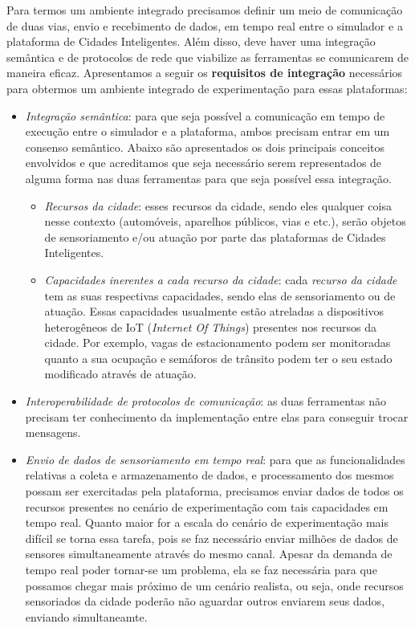 Para termos um ambiente integrado precisamos definir um meio de comunicação de duas vias, envio e recebimento de dados, em tempo real entre o simulador e a plataforma de Cidades Inteligentes.
Além disso, deve haver uma integração semântica e de protocolos de rede que viabilize as ferramentas se comunicarem de maneira eficaz.
Apresentamos a seguir os \textbf{requisitos de integração} necessários para obtermos um ambiente integrado de experimentação para essas plataformas:

\begin{itemize}
    \item \textit{Integração semântica}: para que seja possível a comunicação em tempo de execução entre o simulador e a plataforma, ambos precisam entrar em um consenso semântico.
        Abaixo são apresentados os dois principais conceitos envolvidos e que acreditamos que seja necessário serem representados de alguma forma nas duas ferramentas para que seja
        possível essa integração.

        \begin{itemize}
            \item \textit{Recursos da cidade}: esses recursos da cidade, sendo eles qualquer coisa nesse contexto (automóveis, aparelhos públicos, vias e etc.), serão objetos de
                sensoriamento e/ou atuação por parte das plataformas de Cidades Inteligentes.

            \item \textit{Capacidades inerentes a cada recurso da cidade}: cada \textit{recurso da cidade} tem as suas respectivas capacidades, sendo elas de sensoriamento ou de atuação.
                Essas capacidades usualmente estão atreladas a dispositivos heterogêneos de IoT (\textit{Internet Of Things}) presentes nos recursos da cidade.
                Por exemplo, vagas de estacionamento podem ser monitoradas quanto a sua ocupação e semáforos de trânsito podem ter o seu estado modificado através de atuação.
        \end{itemize}

    \item \textit{Interoperabilidade de protocolos de comunicação}: as duas ferramentas não precisam ter conhecimento da implementação entre elas para conseguir trocar mensagens.

    \item \textit{Envio de dados de sensoriamento em tempo real}: para que as funcionalidades relativas a coleta e armazenamento de dados, e processamento dos mesmos possam ser
        exercitadas pela plataforma, precisamos enviar dados de todos os recursos presentes no cenário de experimentação com tais capacidades em tempo real.
        Quanto maior for a escala do cenário de experimentação mais difícil se torna essa tarefa, pois se faz necessário enviar milhões de dados de sensores simultaneamente através
        do mesmo canal.
        Apesar da demanda de tempo real poder tornar-se um problema, ela se faz necessária para que possamos chegar mais próximo de um cenário realista, ou seja, onde recursos sensoriados
        da cidade poderão não aguardar outros enviarem seus dados, enviando simultaneamte.


\end{itemize}

